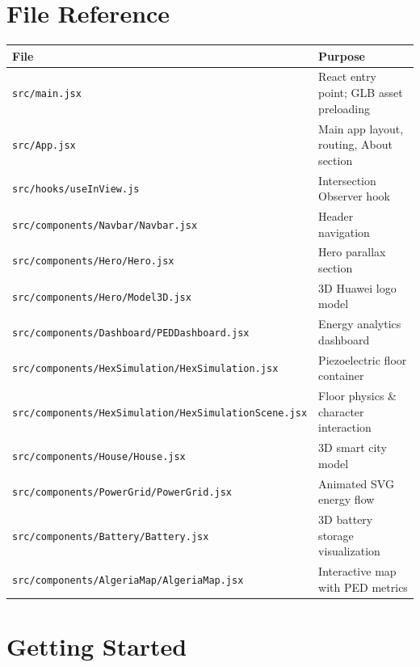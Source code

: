\documentclass[12pt,a4paper]{article}
\begin{document}
\section{File Reference}

\begin{longtable}{@{}p{6.5cm}p{8cm}@{}}
    \toprule
    \textbf{File} & \textbf{Purpose} \\
    \midrule
    \endhead
    \texttt{src/main.jsx}                                  & React entry point; GLB asset preloading \\
    \texttt{src/App.jsx}                                   & Main app layout, routing, About section \\
    \texttt{src/hooks/useInView.js}                        & Intersection Observer hook \\
    \texttt{src/components/Navbar/Navbar.jsx}               & Header navigation \\
    \texttt{src/components/Hero/Hero.jsx}                   & Hero parallax section \\
    \texttt{src/components/Hero/Model3D.jsx}                & 3D Huawei logo model \\
    \texttt{src/components/Dashboard/PEDDashboard.jsx}      & Energy analytics dashboard \\
    \texttt{src/components/HexSimulation/HexSimulation.jsx} & Piezoelectric floor container \\
    \texttt{src/components/HexSimulation/HexSimulationScene.jsx} & Floor physics \& character interaction \\
    \texttt{src/components/House/House.jsx}                 & 3D smart city model \\
    \texttt{src/components/PowerGrid/PowerGrid.jsx}         & Animated SVG energy flow \\
    \texttt{src/components/Battery/Battery.jsx}             & 3D battery storage visualization \\
    \texttt{src/components/AlgeriaMap/AlgeriaMap.jsx}       & Interactive map with PED metrics \\
    \bottomrule
\end{longtable}

\section{Getting Started}
\end{document}
